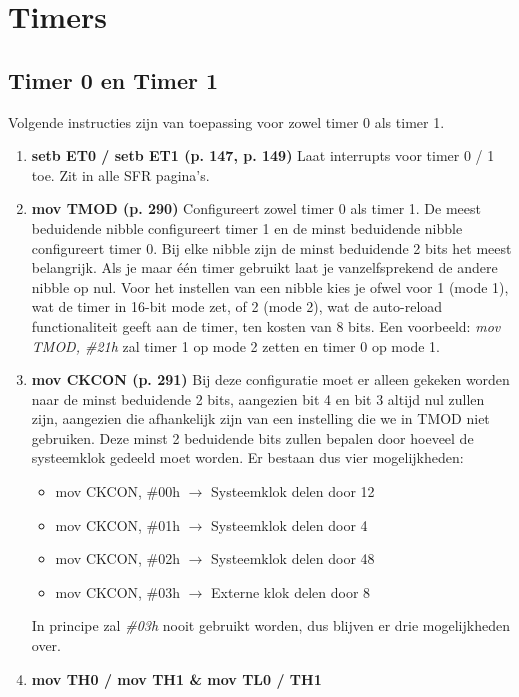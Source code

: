 \documentclass{report}
\begin{document}
\chapter{Timers}
\section{Timer 0 en Timer 1}
Volgende instructies zijn van toepassing voor zowel timer 0 als timer 1.
\begin{enumerate}
	\item \textbf{setb ET0 / setb ET1 (p. 147, p. 149)}
	\newline
	Laat interrupts voor timer 0 / 1 toe. Zit in alle SFR pagina's.
	\item \textbf{mov TMOD (p. 290)}
	\newline
	Configureert zowel timer 0 als timer 1. De meest beduidende nibble configureert timer 1 en de minst beduidende nibble configureert timer 0. Bij elke nibble zijn de minst beduidende 2 bits het meest belangrijk. Als je maar één timer gebruikt laat je vanzelfsprekend de andere nibble op nul. Voor het instellen van een nibble kies je ofwel voor 1 (mode 1), wat de timer in 16-bit mode zet, of 2 (mode 2), wat de auto-reload functionaliteit geeft aan de timer, ten kosten van 8 bits. Een voorbeeld: \textit{mov TMOD, \#21h} zal timer 1 op mode 2 zetten en timer 0 op mode 1.
	\item \textbf{mov CKCON (p. 291)}
	\newline
	Bij deze configuratie moet er alleen gekeken worden naar de minst beduidende 2 bits, aangezien bit 4 en bit 3 altijd nul zullen zijn, aangezien die afhankelijk zijn van een instelling die we in TMOD niet gebruiken. Deze minst 2 beduidende bits zullen bepalen door hoeveel de systeemklok gedeeld moet worden. Er bestaan dus vier mogelijkheden: 
	\begin{itemize}
		\item mov CKCON, \#00h $\rightarrow$ Systeemklok delen door 12
		\item mov CKCON, \#01h $\rightarrow$ Systeemklok delen door 4
		\item mov CKCON, \#02h $\rightarrow$ Systeemklok delen door 48
		\item mov CKCON, \#03h $\rightarrow$ Externe klok delen door 8
	\end{itemize}
	In principe zal \textit{\#03h} nooit gebruikt worden, dus blijven er drie mogelijkheden over.
	\item \textbf{mov TH0 / mov TH1 \& mov TL0 / TH1}
	\newline

\end{enumerate}
\end{document}
